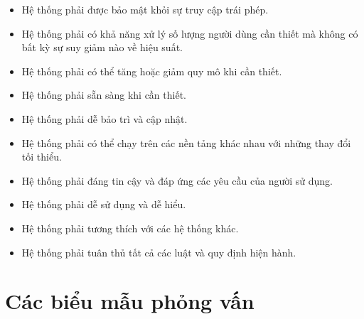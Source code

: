 \documentclass[a4paper,oneside]{report}
\begin{document}
\begin{itemize}
    \item 
    Hệ thống phải được bảo mật khỏi sự truy cập trái phép. 
    \item 
    Hệ thống phải có khả năng xử lý số lượng người dùng cần thiết mà không có bất kỳ sự suy giảm nào về hiệu suất. 
    \item 
    Hệ thống phải có thể tăng hoặc giảm quy mô khi cần thiết. 
    \item 
    Hệ thống phải sẵn sàng khi cần thiết. 
    \item 
    Hệ thống phải dễ bảo trì và cập nhật. 
    \item 
    Hệ thống phải có thể chạy trên các nền tảng khác nhau với những thay đổi tối thiểu. 
    \item 
    Hệ thống phải đáng tin cậy và đáp ứng các yêu cầu của người sử dụng. 
    \item 
    Hệ thống phải dễ sử dụng và dễ hiểu. 
    \item 
    Hệ thống phải tương thích với các hệ thống khác. 
    \item 
    Hệ thống phải tuân thủ tất cả các luật và quy định hiện hành. 

\end{itemize}

\section{Các biểu mẫu phỏng vấn}
\end{document}
